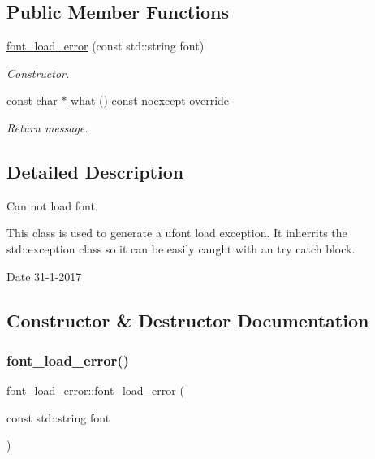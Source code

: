 \subsection*{Public Member Functions}
\begin{DoxyCompactItemize}
\item 
\hyperlink{classfont__load__error_ae7d125fc4bd751d97556cb343a6c6fc4}{font\+\_\+load\+\_\+error} (const std\+::string font)
\begin{DoxyCompactList}\small\item\em Constructor. \end{DoxyCompactList}\item 
const char $\ast$ \hyperlink{classfont__load__error_a17c3014c5953ab5863585e4cbf8865c3}{what} () const noexcept override
\begin{DoxyCompactList}\small\item\em Return message. \end{DoxyCompactList}\end{DoxyCompactItemize}


\subsection{Detailed Description}
Can not load font. 

This class is used to generate a ufont load exception. It inherrits the std\+::exception class so it can be easily caught with an try catch block.

\begin{DoxyDate}{Date}
31-\/1-\/2017 
\end{DoxyDate}


\subsection{Constructor \& Destructor Documentation}
\mbox{\label{classfont__load__error_ae7d125fc4bd751d97556cb343a6c6fc4}} 
\subsubsection{\texorpdfstring{font\+\_\+load\+\_\+error()}{font\_load\_error()}}
{\footnotesize\ttfamily font\+\_\+load\+\_\+error\+::font\+\_\+load\+\_\+error (\begin{DoxyParamCaption}\item[{const std\+::string}]{font }\end{DoxyParamCaption})\hspace{0.3cm}{\ttfamily [inline]}}



